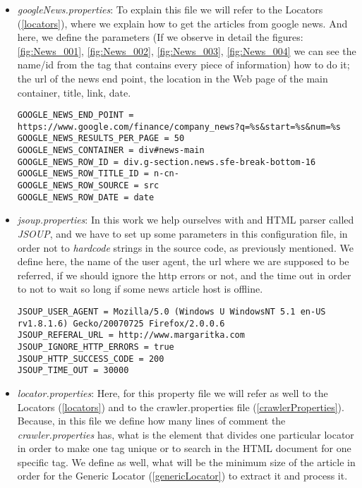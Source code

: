 \begin{itemize}
	\item \emph{googleNews.properties}: To explain this file we will refer to the Locators (\ref{locators}), where we explain how to get the articles from google news. And here, we define the parameters (If we observe in detail the figures: \ref{fig:News_001}, \ref{fig:News_002}, \ref{fig:News_003}, \ref{fig:News_004}  we can see the name/id from the tag that contains every piece of information) how to do it; the url of the news end point, the location in the Web page of the main container, title, link, date. 
	
\begin{lstlisting}
GOOGLE_NEWS_END_POINT = https://www.google.com/finance/company_news?q=%s&start=%s&num=%s
GOOGLE_NEWS_RESULTS_PER_PAGE = 50
GOOGLE_NEWS_CONTAINER = div#news-main
GOOGLE_NEWS_ROW_ID = div.g-section.news.sfe-break-bottom-16
GOOGLE_NEWS_ROW_TITLE_ID = n-cn-
GOOGLE_NEWS_ROW_SOURCE = src
GOOGLE_NEWS_ROW_DATE = date
\end{lstlisting}	
	
	\item \emph{jsoup.properties}: In this work we help ourselves with and HTML parser called \emph{JSOUP}, and we have to set up some parameters in this configuration file, in order not to \emph{hardcode} strings in the source code, as previously mentioned. We define here, the name of the user agent, the url where we are supposed to be referred, if we should ignore the http errors or not, and the time out in order to not to wait so long if some news article host is offline.
	
\begin{lstlisting}
JSOUP_USER_AGENT = Mozilla/5.0 (Windows U WindowsNT 5.1 en-US rv1.8.1.6) Gecko/20070725 Firefox/2.0.0.6
JSOUP_REFERAL_URL = http://www.margaritka.com
JSOUP_IGNORE_HTTP_ERRORS = true
JSOUP_HTTP_SUCCESS_CODE = 200
JSOUP_TIME_OUT = 30000
\end{lstlisting}
	
	\item \emph{locator.properties}: Here, for this property file we will refer as well to the Locators (\ref{locators}) and to the crawler.properties file (\ref{crawlerProperties}). Because, in this file we define how many lines of comment the \emph{crawler.properties} has, what is the element that divides one particular locator in order to make one tag unique or to search in the HTML document for one specific tag. We define as well, what will be the minimum size of the article in order for the Generic Locator (\ref{genericLocator}) to extract it and process it.
	

\end{itemize}
